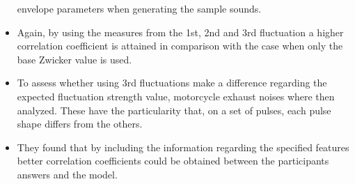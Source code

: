 \begin{itemize}
        envelope parameters when generating the sample sounds.
    \item Again, by using the measures from the 1st, 2nd and 3rd fluctuation a
        higher correlation coefficient is attained in comparison with the case
        when only the base Zwicker value is used.
    \item To assess whether using 3rd fluctuations make a difference regarding
        the expected fluctuation strength value, motorcycle exhaust noises where
        then analyzed. These have the particularity that, on a set of pulses,
        each pulse shape differs from the others.
    \item They found that by including the information regarding the specified
        features better correlation coefficients could be obtained between the
        participants answers and the model.
\end{itemize}

